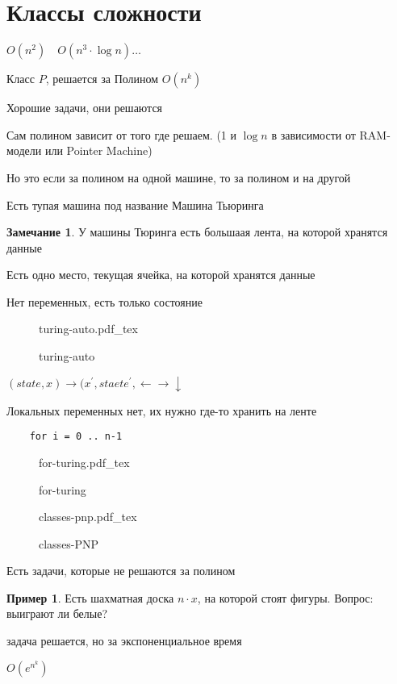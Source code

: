 \documentclass{book}
\newcommand{\p}[1]{#1^{\prime}}
\theoremstyle{definition}
\newtheorem*{note}{Замечание}
\newtheorem*{example}{Пример}
\newcommand{\incfig}[1]{%
    \def\svgwidth{\columnwidth}
    {#1.pdf_tex}
}
\begin{document}
\section{Классы сложности}

$O(n^2)\quad O\left( n^3\cdot \log n \right) \ldots$

Класс $P$, решается за Полином  $O(n^k)$

Хорошие задачи, они решаются

Сам полином зависит от того где решаем. (1 и $\log n$ в зависимости от RAM-модели или Pointer Machine) 

Но это если за полином на одной машине, то за полином и на другой

Есть тупая машина под название Машина Тьюринга

\begin{note}
    У машины Тюринга есть большаая лента, на которой хранятся данные

    Есть одно место, текущая ячейка, на которой хранятся данные

    Нет переменных, есть только состояние

\begin{figure}[!ht]
    \centering
    \incfig{turing-auto}
    \caption{turing-auto}
    \label{fig:turing-auto}
\end{figure}

$(state, x) \to (\p x, staet \p e, \leftarrow \rightarrow \downarrow$
\end{note}

Локальных переменных нет, их нужно где-то хранить на ленте

\begin{lstlisting}
    for i = 0 .. n-1
\end{lstlisting}

\begin{figure}[!ht]
    \centering
    \incfig{for-turing}
    \caption{for-turing}
    \label{fig:for-turing}
\end{figure}


\begin{figure}[!ht]
    \centering
    \incfig{classes-pnp}
    \caption{classes-PNP}
    \label{fig:classes-pnp}
\end{figure}

Есть задачи, которые не решаются за полином

\begin{example}
    Есть шахматная доска $n\cdot x$, на которой стоят фигуры. Вопрос: выиграют ли белые?

    задача решается, но за экспоненциальное время

    $O\left(e^{n^k}  \right) $
\end{example}
\end{document}
